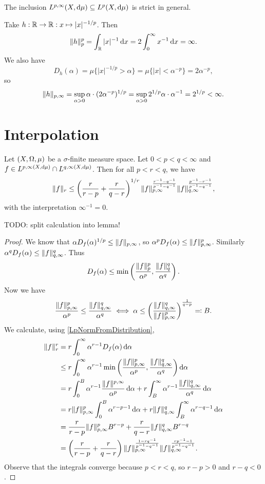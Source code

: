 \begin{example}
The inclusion $L^{p,\infty}(X,\operatorname{d \!}{\mu}) \subseteq L^{p}(X,\operatorname{d \!}{\mu})$ is strict in general.

Take $h: \mathbb{R}\to \mathbb{R}: x\mapsto |x|^{-1/p}$. Then
\[ \lVert h\rVert_p^p = \int_{\mathbb{R}} |x|^{-1} \operatorname{d \!}{x} = 2\int_0^\infty x^{-1}\operatorname{d \!}{x} = \infty. \]
We also have
\[ D_h(\alpha) = \mu\big\{|x|^{-1/p} > \alpha\big\} = \mu\big\{|x| < \alpha^{-p}\big\} = 2\alpha^{-p}, \]
so
\[ \lVert h\rVert_{p,\infty} = \sup_{\alpha > 0}\alpha\cdot (2\alpha^{-p})^{1/p} = \sup_{\alpha > 0}2^{1/p}\alpha\cdot \alpha^{-1} = 2^{1/p} < \infty. \]
\end{example}

\section{Interpolation}

\begin{proposition}
Let $\sSet{X,\Omega, \mu}$ be a $\sigma$-finite measure space.
Let $0<p<q<\infty$ and $f\in L^{p,\infty(X,\operatorname{d \!}{\mu})} \cap L^{q,\infty(X,\operatorname{d \!}{\mu})}$. Then for all $p<r<q$, we have
\[ \lVert f\rVert_r \leq \left(\frac{r}{r-p} + \frac{r}{q-r}\right)^{1/r}\lVert f\rVert_{p,\infty}^{\frac{r^{-1}- q^{-1}}{p^{-1} - q^{-1}}}\lVert f\rVert_{q,\infty}^{\frac{p^{-1}- r^{-1}}{p^{-1} - q^{-1}}}, \]
with the interpretation $\infty^{-1} = 0$.
\end{proposition}
TODO: split calculation into lemma!
\begin{proof}
We know that $\alpha D_f(\alpha)^{1/p} \leq \lVert f\rVert_{p,\infty}$, so $\alpha^p D_f(\alpha) \leq \lVert f\rVert_{p,\infty}^p$. Similarly $\alpha^q D_f(\alpha) \leq \lVert f\rVert_{q,\infty}^q$. Thus
\[ D_f(\alpha) \leq \min\left(\frac{\lVert f\rVert^p_p}{\alpha^p}, \frac{\lVert f\rVert^q_q}{\alpha^q}\right). \]
Now we have
\[ \frac{\lVert f\rVert^p_{p,\infty}}{\alpha^p} \leq \frac{\lVert f\rVert^q_{q,\infty}}{\alpha^q} \iff \alpha \leq \left(\frac{\lVert f\rVert_{q,\infty}^q}{\lVert f\rVert_{p,\infty}^p}\right)^{\frac{1}{q-p}} \eqqcolon B. \]
We calculate, using \ref{LpNormFromDistribution},
\begin{align*}
\lVert f\rVert_r^r &= r \int_0^\infty\alpha^{r-1}D_f(\alpha)\operatorname{d \!}{\alpha} \\
&\leq r \int_0^\infty\alpha^{r-1}\min\left(\frac{\lVert f\rVert^p_{p,\infty}}{\alpha^p}, \frac{\lVert f\rVert^q_{q,\infty}}{\alpha^q}\right)\operatorname{d \!}{\alpha} \\
&= r \int_0^B\alpha^{r-1}\frac{\lVert f\rVert^{p,\infty}}{\alpha^p}\operatorname{d \!}{\alpha} + r \int_B^\infty\alpha^{r-1}\frac{\lVert f\rVert^q_{q,\infty}}{\alpha^q}\operatorname{d \!}{\alpha} \\
&= r \lVert f\rVert^p_{p,\infty} \int_0^B\alpha^{r-p-1}\operatorname{d \!}{\alpha} + r \lVert f\rVert^q_{q,\infty} \int_B^\infty\alpha^{r-q-1}\operatorname{d \!}{\alpha} \\
&= \frac{r}{r-p} \lVert f\rVert^p_{p,\infty} B^{r-p} + \frac{r}{q-r} \lVert f\rVert^q_{q,\infty} B^{r-q} \\
&= \left(\frac{r}{r-p} + \frac{r}{q-r}\right)\lVert f\rVert_{p,\infty}^{\frac{1- rq^{-1}}{p^{-1} - q^{-1}}}\lVert f\rVert_{q,\infty}^{\frac{rp^{-1}- 1}{p^{-1} - q^{-1}}}.
\end{align*}
Observe that the integrals converge because $p<r<q$, so $r-p>0$ and $r-q<0$.
\end{proof}

